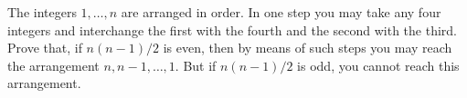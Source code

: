 The integers $1, \ldots, n$ are arranged in order. In one step you may take any four integers and interchange the first with the fourth and the second with the third. Prove that, if $n(n - 1)/2$ is even, then by means of such steps you may reach the arrangement $n, n - 1, \ldots, 1$. But if $n(n - 1)/2$ is odd, you cannot reach this arrangement.
